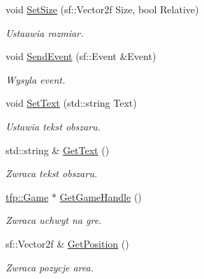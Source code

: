 \begin{DoxyCompactItemize}
void \mbox{\hyperlink{classtfp_1_1_input_area_a3eed53b200f26c41388d2a5f72d67686}{Set\+Size}} (sf\+::\+Vector2f Size, bool Relative)
\begin{DoxyCompactList}\small\item\em Ustaawia rozmiar. \end{DoxyCompactList}\item 
void \mbox{\hyperlink{classtfp_1_1_input_area_ab37ba94e3de8df626cf8d48701921fe7}{Send\+Event}} (sf\+::\+Event \&Event)
\begin{DoxyCompactList}\small\item\em Wysyla event. \end{DoxyCompactList}\item 
\mbox{\label{classtfp_1_1_input_area_a4cc1c009baad9120f4b52768c6e7562b}} 
void \mbox{\hyperlink{classtfp_1_1_input_area_a4cc1c009baad9120f4b52768c6e7562b}{Set\+Text}} (std\+::string Text)
\begin{DoxyCompactList}\small\item\em Ustawia tekst obszaru. \end{DoxyCompactList}\item 
\mbox{\label{classtfp_1_1_input_area_a8ea6103187dc1d824c3c70d4fd5dc2aa}} 
std\+::string \& \mbox{\hyperlink{classtfp_1_1_input_area_a8ea6103187dc1d824c3c70d4fd5dc2aa}{Get\+Text}} ()
\begin{DoxyCompactList}\small\item\em Zwraca tekst obszaru. \end{DoxyCompactList}\item 
\mbox{\label{classtfp_1_1_input_area_aa7367df3ffa653430a7d98982e40e348}} 
\mbox{\hyperlink{classtfp_1_1_game}{tfp\+::\+Game}} $\ast$ \mbox{\hyperlink{classtfp_1_1_input_area_aa7367df3ffa653430a7d98982e40e348}{Get\+Game\+Handle}} ()
\begin{DoxyCompactList}\small\item\em Zwraca uchwyt na gre. \end{DoxyCompactList}\item 
\mbox{\label{classtfp_1_1_input_area_a54f523f378d4cd2410e5c2a81d8dd9f6}} 
sf\+::\+Vector2f \& \mbox{\hyperlink{classtfp_1_1_input_area_a54f523f378d4cd2410e5c2a81d8dd9f6}{Get\+Position}} ()
\begin{DoxyCompactList}\small\item\em Zwraca pozycje area. \end{DoxyCompactList}\item 

\end{DoxyCompactItemize}
